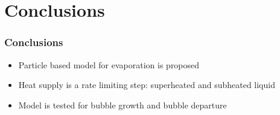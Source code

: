 \documentclass{beamer}
\begin{document}
\section{Conclusions}
\begin{frame}
  \frametitle{Conclusions}
  \begin{itemize}
  \item Particle based model for evaporation is proposed
  \item Heat supply is a rate limiting step: superheated and subheated
    liquid
  \item Model is tested for bubble growth and bubble departure
  \end{itemize}
\end{frame}
\end{document}
